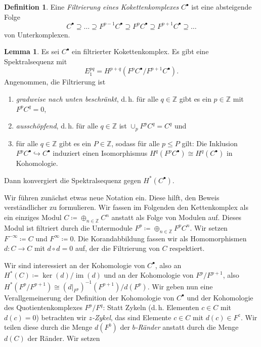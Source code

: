 \documentclass[11pt, a4paper, german]{article}
\theoremstyle{definition}
\newtheorem*{lem}{Lemma}
\newtheorem*{defn}{Definition}
\theoremstyle{remark}
\newcommand{\Z}{\mathbb{Z}} %
\DeclareMathOperator{\im}{im} %
\newcommand{\ES}{Es sei} %
\renewcommand{\dh}{d.\,h.} %
\begin{document}

\begin{defn}
  Eine \emph{Filtrierung eines Kokettenkomplexes} $C^\bullet$ ist eine absteigende Folge
  \[ C^\bullet \supseteq \ldots \supseteq F^{p-1} C^\bullet \supseteq F^p C^\bullet \supseteq F^{p+1} C^\bullet \supseteq \ldots \]
 von Unterkomplexen.
\end{defn}


\begin{lem}
  \ES{} $C^\bullet$ ein filtrierter Kokettenkomplex.
  Es gibt eine Spektralsequenz mit
  \[ E_1^{pq} = H^{p+q}(F^p C^\bullet / F^{p+1} C^\bullet). \]
  Angenommen, die Filtrierung ist
  \begin{enumerate}[label=\alph*)]
    \item \emph{gradweise nach unten beschränkt}, \dh{} für alle $q \in \Z$ gibt es ein $p \in \Z$ mit $F^p C^q = 0$,
    \item \emph{ausschöpfend}, \dh{} für alle $q \in \Z$ ist $\cup_p F^p C^q = C^q$ und %
    \item für alle $q \in \Z$ gibt es ein $P \in \Z$, sodass für alle $p \leq P$ gilt: Die Inklusion $F^p C^\bullet \hookrightarrow C^\bullet$ induziert einen Isomorphismus $H^q (F^p C^\bullet) \cong H^q(C^\bullet)$ in Kohomologie.
  \end{enumerate}
  Dann konvergiert die Spektralsequenz gegen $H^*(C^\bullet)$.
\end{lem}

Wir führen zunächst etwas neue Notation ein.
Diese hilft, den Beweis verständlicher zu formulieren.
Wir fassen im Folgenden den Kettenkomplex als ein einziges Modul $C \coloneqq \oplus_{n \in \Z} C^n$ anstatt als Folge von Modulen auf.
Dieses Modul ist filtriert durch die Untermodule $F^p \coloneqq \oplus_{n \in \Z} F^p C^n$.
Wir setzen $F^{-\infty} \coloneqq C$ und $F^{\infty} \coloneqq 0$.
Die Korandabbildung fassen wir als Homomorphismen $d : C \to C$ mit $d \circ d = 0$ auf, der die Filtrierung von $C$ respektiert.

Wir sind interessiert an der Kohomologie von $C^\bullet$, also an $H^*(C) \coloneqq \ker(d) / \im(d)$ und an der Kohomologie von $F^p / F^{p+1}$, also $H^*(F^p / F^{p+1}) \cong (d|_{F^p})^{-1}(F^{p+1}) / d(F^p)$.
Wir geben nun eine Verallgemeinerung der Definition der Kohomologie von $C^\bullet$ und der Kohomologie des Quotientenkomplexes $F^p / F^q$: Statt Zykeln (\dh{} Elementen $c \in C$ mit $d(c) = 0$) betrachten wir \emph{$z$-Zykel}, das sind Elemente $c \in C$ mit $d(c) \in F^z$. Wir teilen diese durch die Menge $d(F^b)$ der \emph{$b$-Ränder} anstatt durch die Menge $d(C)$ der Ränder. Wir setzen
\end{document}

